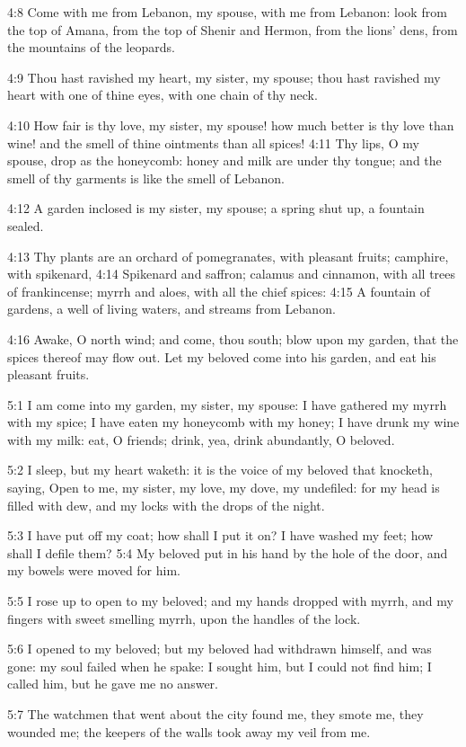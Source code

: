 4:8 Come with me from Lebanon, my spouse, with me from Lebanon: look from the top of Amana, from the top of Shenir and Hermon, from the lions' dens, from the mountains of the leopards.

4:9 Thou hast ravished my heart, my sister, my spouse; thou hast ravished my heart with one of thine eyes, with one chain of thy neck.

4:10 How fair is thy love, my sister, my spouse! how much better is thy love than wine! and the smell of thine ointments than all spices!  4:11 Thy lips, O my spouse, drop as the honeycomb: honey and milk are under thy tongue; and the smell of thy garments is like the smell of Lebanon.

4:12 A garden inclosed is my sister, my spouse; a spring shut up, a fountain sealed.

4:13 Thy plants are an orchard of pomegranates, with pleasant fruits; camphire, with spikenard, 4:14 Spikenard and saffron; calamus and cinnamon, with all trees of frankincense; myrrh and aloes, with all the chief spices: 4:15 A fountain of gardens, a well of living waters, and streams from Lebanon.

4:16 Awake, O north wind; and come, thou south; blow upon my garden, that the spices thereof may flow out. Let my beloved come into his garden, and eat his pleasant fruits.

5:1 I am come into my garden, my sister, my spouse: I have gathered my myrrh with my spice; I have eaten my honeycomb with my honey; I have drunk my wine with my milk: eat, O friends; drink, yea, drink abundantly, O beloved.

5:2 I sleep, but my heart waketh: it is the voice of my beloved that knocketh, saying, Open to me, my sister, my love, my dove, my undefiled: for my head is filled with dew, and my locks with the drops of the night.

5:3 I have put off my coat; how shall I put it on? I have washed my feet; how shall I defile them?  5:4 My beloved put in his hand by the hole of the door, and my bowels were moved for him.

5:5 I rose up to open to my beloved; and my hands dropped with myrrh, and my fingers with sweet smelling myrrh, upon the handles of the lock.

5:6 I opened to my beloved; but my beloved had withdrawn himself, and was gone: my soul failed when he spake: I sought him, but I could not find him; I called him, but he gave me no answer.

5:7 The watchmen that went about the city found me, they smote me, they wounded me; the keepers of the walls took away my veil from me.

